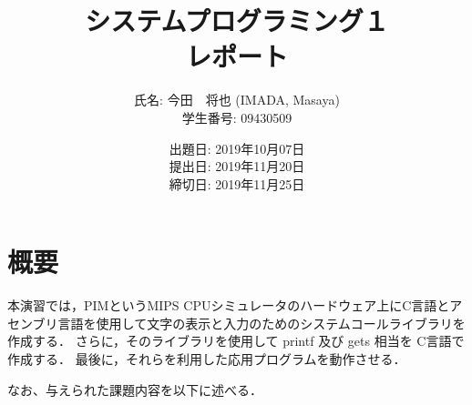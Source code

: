 \documentclass[a4j,11pt]{jarticle}
\title{システムプログラミング１ \\
       レポート}
\author{氏名: 今田　将也 (IMADA, Masaya) \\
        学生番号: 09430509}
\date{出題日: 2019年10月07日 \\
      提出日: 2019年11月20日 \\
      締切日: 2019年11月25日 \\}  %
\begin{document}
\maketitle


\section{概要} \label{chap:abstract}

本演習では，PIMというMIPS CPUシミュレータのハードウェア上にC言語とアセンブリ言語を使用して文字の表示と入力のためのシステムコールライブラリを作成する． さらに，そのライブラリを使用して printf 及び gets 相当を C言語で作成する． 最後に，それらを利用した応用プログラムを動作させる．


なお、与えられた課題内容を以下に述べる．
\end{document}
